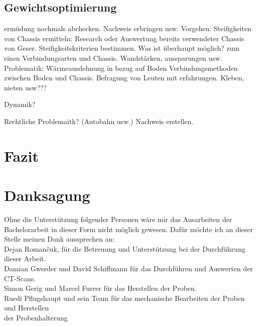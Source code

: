 \subsection{Gewichtsoptimierung}

ermüdung nochmals abchecken. Nachweis erbringen usw.
Vorgehen:
Steifigkeiten von Chassis ermitteln: Research oder Auswertung bereits verwendeter Chassis von Geser.
Steifigkeitskriterien bestimmen.
Was ist überhaupt möglich? zum einen Verbindungsarten und Chassis. Wandstärken, aussparungen usw.
Problematik: Wärmeausdehnung in bezug auf Boden
Verbindungsmethoden zwischen Boden und Chassis. Befragung von Leuten mit erfahrungen. Kleben, nieten usw???

Dynamik?

Rechtliche Problemaitk? (Autobahn usw.) Nachweis erstellen.







\newpage

\section{Fazit}


\newpage

\section{Danksagung}
Ohne die Unterstützung folgender Personen wäre mir das Ausarbeiten der Bachelorarbeit in dieser Form nicht möglich gewesen. Dafür möchte ich an dieser Stelle meinen Dank aussprechen an:\\
Dejan Roman\v{c}uk, für die Betreuung und Unterstützung bei der Durchführung dieser Arbeit.\\
Damian Gwerder und David Schiffmann für das Durchführen und Auswerten der CT-Scans.\\
Simon Gerig und Marcel Furrer für das Herstellen der Proben.\\
Ruedi Pflugshaupt und sein Team für das mechanische Bearbeiten der Proben und Herstellen\\
der Probenhalterung\\
\newpage
